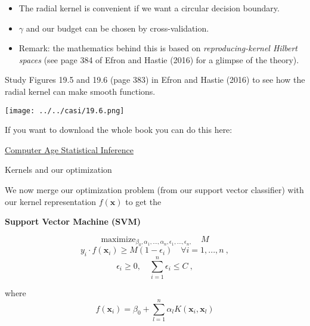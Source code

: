 \documentclass[10pt,ignorenonframetext,]{beamer}
\begin{document}
\begin{frame}

\begin{itemize}
\item
  The radial kernel is convenient if we want a circular decision
  boundary.
\item
  \(\gamma\) and our budget can be chosen by cross-validation.
\item
  Remark: the mathematics behind this is based on
  \emph{reproducing-kernel Hilbert spaces} (see page 384 of Efron and
  Hastie (2016) for a glimpse of the theory).
\end{itemize}

\end{frame}

\begin{frame}

Study Figures 19.5 and 19.6 (page 383) in Efron and Hastie (2016) to see
how the radial kernel can make smooth functions.

\centering

\texttt{[image: ../../casi/19.6.png]}

\flushleft
\small

If you want to download the whole book you can do this here:

\href{https://web.stanford.edu/~hastie/CASI_files/PDF/casi.pdf}{Computer
Age Statistical Inference}

\end{frame}

\begin{frame}

\begin{block}{Kernels and our optimization}

\vspace{2mm}

We now merge our optimization problem (from our support vector
classifier) with our kernel representation \(f({\boldsymbol x})\) to get
the

\vspace{4mm}

\textbf{Support Vector Machine (SVM)}

\[\mathrm{maximize}_{\beta_0,\alpha_1,...,\alpha_n,\epsilon_1,...,\epsilon_n,} \quad M \]
\[y_i \cdot f({\boldsymbol x}_i)\geq M(1-\epsilon_i) \quad  \forall i=1,...,n \ ,\]
\[\epsilon_i\geq 0, \quad \sum_{i=1}^n \epsilon_i \leq C \ ,\]

where
\[f({\boldsymbol x}_i)=\beta_0 +\sum_{l=1}^n \alpha_l K({\boldsymbol x}_i,{\boldsymbol x}_l)\]

\end{block}

\end{frame}
\end{document}
